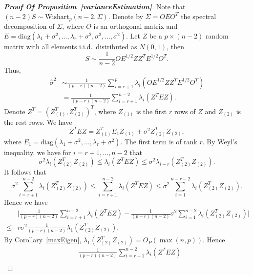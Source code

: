 
\begin{proof}[\textbf{Proof Of Proposition~\ref{varianceEstimation}}]
    Note that $(n-2)S\sim \mathrm{Wishart}_p (n-2,\Sigma)$.
    Denote by $\Sigma=OEO^T$ the spectral decomposition of $\Sigma$, where $O$ is an orthogonal matrix and $E=\mathrm{diag}(\lambda_1+\sigma^2,\ldots,\lambda_r+\sigma^2,\sigma^2,\ldots,\sigma^2)$.
    Let $Z$ be a $p\times (n-2)$ random matrix with all elements i.i.d.\ distributed as $N(0,1)$, then
    $$
        S\sim \frac{1}{n-2} O E^{1/2} Z Z^T E^{1/2} O^T.
    $$
    Thus,
    \begin{equation*}
        \begin{aligned}
            \hat{\sigma}^2&\sim
            \frac{1}{(p-r)(n-2)}\sum_{i=r+1}^p \lambda_i (O E^{1/2} Z Z^T E^{1/2} O^T)\\
            &=
            \frac{1}{(p-r)(n-2)}\sum_{i=r+1}^{n-2} \lambda_i ( Z^T E Z).
        \end{aligned}
    \end{equation*}
    Denote $Z^T={(Z_{(1)}^T,Z_{(2)}^T)}^T$, where $Z_{(1)}$ is the first $r$ rows of $Z$ and $Z_{(2)}$ is the rest rows. We have
    $$
    Z^T E Z =Z_{(1)}^T E_1 Z_{(1)}+\sigma^2 Z_{(2)}^T Z_{(2)},
    $$
    where $E_1=\mathrm{diag}(\lambda_1+\sigma^2,\ldots,\lambda_r +\sigma^2)$. The first term is of rank $r$. By Weyl's inequality, we have for $i=r+1,\ldots, n-2$ that
    $$
    \sigma^2\lambda_i(Z_{(2)}^T Z_{(2)}) \leq \lambda_i(Z^T E Z)\leq
    \sigma^2\lambda_{i-r}(Z_{(2)}^T Z_{(2)}).
    $$
    It follows that
    $$
    \sigma^2\sum_{i=r+1}^{n-2}\lambda_i(Z_{(2)}^T Z_{(2)}) \leq \sum_{i=r+1}^{n-2}\lambda_i(Z^T E Z)\leq
    \sigma^2\sum_{i=1}^{n-r-2}\lambda_{i}(Z_{(2)}^T Z_{(2)}).
    $$
    Hence we have
     \begin{equation*}
         \begin{aligned}
             &\Big|\frac{1}{(p-r)(n-2)}\sum_{i=r+1}^{n-2}\lambda_i(Z^T E Z)-
    \frac{1}{(p-r)(n-2)} \sigma^2\sum_{i=1}^{n-2}\lambda_{i}(Z_{(2)}^T Z_{(2)})\Big|
             \\
             \leq & r\sigma^2\frac{1}{(p-r)(n-2)} \lambda_1 (Z_{(2)}^T Z_{(2)}).
         \end{aligned}
     \end{equation*}
    By Corollary~\ref{maxEigen}, $\lambda_1 (Z_{(2)}^T Z_{(2)})=O_P(\max(n,p))$. Hence
     \begin{equation*}
         \begin{aligned}
             &\frac{1}{(p-r)(n-2)}\sum_{i=r+1}^{n-2}\lambda_i(Z^T E Z)\\

\end{aligned}
\end{equation*}
\end{proof}
